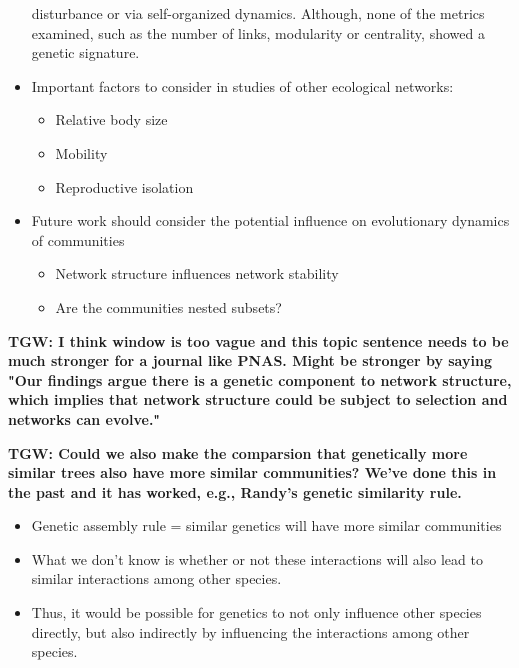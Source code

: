 \documentclass[11pt,twocolumn,twoside,lineno]{pnas-new}
\begin{document}
\begin{itemize}
  disturbance or via self-organized dynamics. Although, none of the
  metrics examined, such as the number of links, modularity or
  centrality, showed a genetic signature.
\item Important factors to consider in studies of other ecological
  networks:
  \begin{itemize}
  \item Relative body size 
  \item Mobility
  \item Reproductive isolation
  \end{itemize}
\item Future work should consider the potential influence on
  evolutionary dynamics of communities
  \begin{itemize}
  \item Network structure influences network stability
  \item Are the communities nested subsets?
  \end{itemize}
\end{itemize}

\textbf{TGW: I think window is too vague and this topic sentence needs
  to be much stronger for a journal like PNAS.  Might be stronger by
  saying "Our findings argue there is a genetic component to network
  structure, which implies that network structure could be subject to
  selection and networks can evolve."}

\textbf{TGW: Could we also make the comparsion that genetically more
  similar trees also have more similar communities?  We've done this
  in the past and it has worked, e.g., Randy's genetic similarity
  rule.}

\begin{itemize}
\item Genetic assembly rule = similar genetics will have more similar
  communities
\item What we don't know is whether or not these interactions will
  also lead to similar interactions among other species.
\item Thus, it would be possible for genetics to not only influence
  other species directly, but also indirectly by influencing the
  interactions among other species.
\end{itemize}
\end{document}
